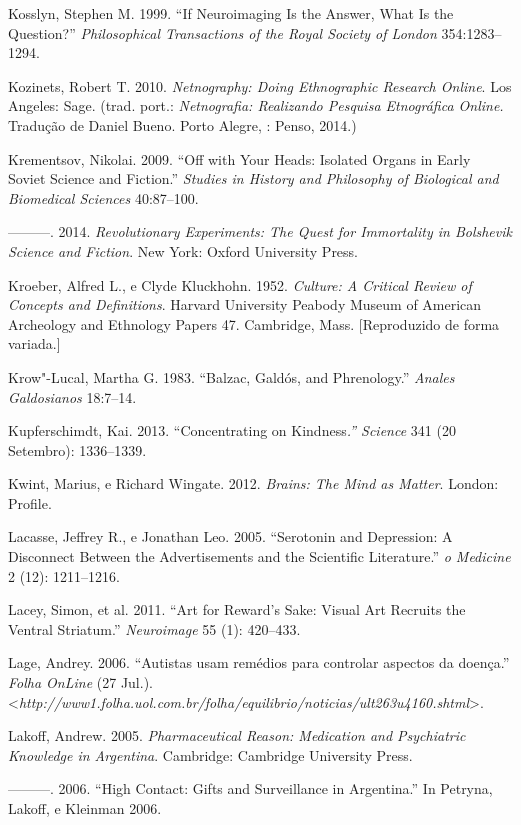 Kosslyn, Stephen M. 1999. ``If Neuroimaging Is the Answer, What Is the
Question?'' \emph{Philosophical Transactions of the Royal Society of
London} 354:1283--1294.

Kozinets, Robert T. 2010. \emph{Netnography: Doing Ethnographic Research
Online}. Los Angeles: Sage. (trad. port.: \emph{Netnografia: Realizando
Pesquisa Etnográfica Online.} Tradução de Daniel Bueno. Porto Alegre,
: Penso, 2014.)

Krementsov, Nikolai. 2009. ``Off with Your Heads: Isolated Organs in
Early Soviet Science and Fiction.'' \emph{Studies in History and
Philosophy of Biological and Biomedical Sciences} 40:87--100.

---------. 2014. \emph{Revolutionary Experiments: The Quest for
Immortality in Bolshevik Science and Fiction}. New York: Oxford
University Press.

Kroeber, Alfred L., e Clyde Kluckhohn. 1952. \emph{Culture: A Critical
Review of Concepts and Definitions}. Harvard University Peabody Museum
of American Archeology and Ethnology Papers 47. Cambridge, Mass.
{[}Reproduzido de forma variada.{]}

Krow"-Lucal, Martha G. 1983. ``Balzac, Galdós, and Phrenology.''
\emph{Anales Galdosianos} 18:7--14.

Kupferschimdt, Kai. 2013. ``Concentrating on Kindness\emph{.'' Science}
341 (20 Setembro): 1336--1339.

Kwint, Marius, e Richard Wingate. 2012. \emph{Brains: The Mind as
Matter}. London: Profile.

Lacasse, Jeffrey R., e Jonathan Leo. 2005. ``Serotonin and Depression: A
Disconnect Between the Advertisements and the Scientific Literature.''
\emph{o Medicine} 2 (12): 1211--1216.

Lacey, Simon, et al. 2011. ``Art for Reward's Sake: Visual Art Recruits
the Ventral Striatum.'' \emph{Neuroimage} 55 (1): 420--433.

Lage, Andrey. 2006. ``Autistas usam remédios para controlar aspectos da
doença.'' \emph{Folha OnLine} (27 Jul.).
\textless{}\emph{http://www1.folha.uol.com.br/folha/equilibrio/noticias/ult263u4160.shtml}\textgreater{}.

Lakoff, Andrew. 2005. \emph{Pharmaceutical Reason: Medication and
Psychiatric Knowledge in Argentina}. Cambridge: Cambridge University
Press.

---------. 2006. ``High Contact: Gifts and Surveillance in Argentina.''
In Petryna, Lakoff, e Kleinman 2006.

